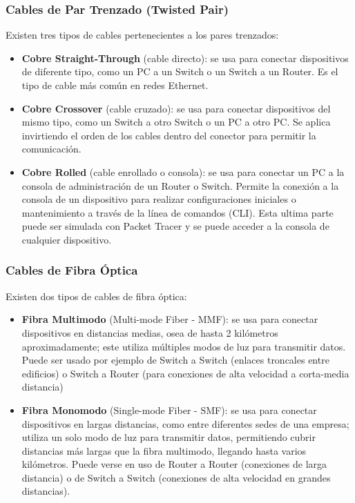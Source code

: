 \documentclass{article}
\begin{document}
\subsubsection{Cables de Par Trenzado (Twisted Pair)}
Existen tres tipos de cables pertenecientes a los pares trenzados: 
\begin{itemize}
    \item \textbf{Cobre Straight-Through} (cable directo): se usa para conectar dispositivos de diferente tipo, como un PC a un Switch o un Switch a un Router. Es el tipo de cable más común en redes Ethernet.
    \item \textbf{Cobre Crossover} (cable cruzado): se usa para conectar dispositivos del mismo tipo, como un Switch a otro Switch o un PC a otro PC. Se aplica invirtiendo el orden de los cables dentro del conector para permitir la comunicación.
    \item \textbf{Cobre Rolled} (cable enrollado o consola): se usa para conectar un PC a la consola de administración de un Router o Switch. Permite la conexión a la consola de un dispositivo para realizar configuraciones iniciales o mantenimiento a través de la línea de comandos (CLI). Esta ultima parte puede ser simulada con Packet Tracer y se puede acceder a la consola de cualquier dispositivo.
\end{itemize}

\subsubsection{Cables de Fibra Óptica}
Existen dos tipos de cables de fibra óptica: 
\begin{itemize}
    \item \textbf{Fibra Multimodo} (Multi-mode Fiber - MMF): se usa para conectar dispositivos en distancias medias, osea de hasta 2 kilómetros aproximadamente; este utiliza múltiples modos de luz para transmitir datos. Puede ser usado por ejemplo de  Switch a Switch (enlaces troncales entre edificios) o Switch a Router (para conexiones de alta velocidad a corta-media distancia)
    \item \textbf{Fibra Monomodo }(Single-mode Fiber - SMF): se usa para conectar dispositivos en largas distancias, como entre diferentes sedes de una empresa; utiliza un solo modo de luz para transmitir datos, permitiendo cubrir distancias más largas que la fibra multimodo, llegando hasta varios kilómetros. Puede verse en uso de Router a Router (conexiones de larga distancia) o de Switch a Switch (conexiones de alta velocidad en grandes distancias).
\end{itemize}
\end{document}
